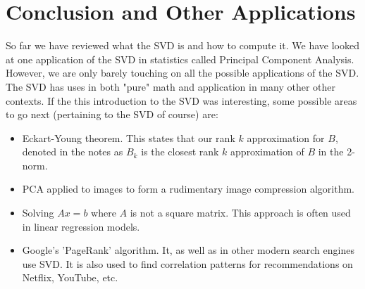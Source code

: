 \documentclass{article}
\begin{document}
\newpage
\section{Conclusion and Other Applications}
So far we have reviewed what the SVD is and how to compute it. We have looked at one application of the SVD in statistics called Principal Component Analysis. However, we are only barely touching on all the possible applications of the SVD. The SVD has uses in both "pure" math and application in many other other contexts. If the this introduction to the SVD was interesting, some possible areas to go next (pertaining to the SVD of course) are:
\begin{itemize}
  \item Eckart-Young theorem. This states that our rank $k$ approximation for $B$, denoted in the notes as $B_k$ is the closest rank $k$ approximation of $B$ in the 2-norm.
  \item PCA applied to images to form a rudimentary image compression algorithm.
  \item Solving $Ax = b$ where $A$ is not a square matrix. This approach is often used in linear regression models.
  \item Google's 'PageRank' algorithm. It, as well as in other modern search engines use SVD. It is also used to find correlation patterns for recommendations on Netflix, YouTube, etc.
\end{itemize}
\end{document}
